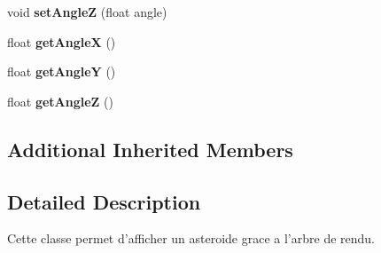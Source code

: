 \begin{DoxyCompactItemize}
\item 
\hypertarget{class_noeud_asteroide_a8674615a93c162a4fdc17768ab0aef0c}{void {\bfseries set\-Angle\-Z} (float angle)}\label{class_noeud_asteroide_a8674615a93c162a4fdc17768ab0aef0c}

\item 
\hypertarget{class_noeud_asteroide_a80b8db5ca5b9ae9ae14da2397aab19b5}{float {\bfseries get\-Angle\-X} ()}\label{class_noeud_asteroide_a80b8db5ca5b9ae9ae14da2397aab19b5}

\item 
\hypertarget{class_noeud_asteroide_a7b242e9e31832e72914cb31493521f3e}{float {\bfseries get\-Angle\-Y} ()}\label{class_noeud_asteroide_a7b242e9e31832e72914cb31493521f3e}

\item 
\hypertarget{class_noeud_asteroide_a8c5d24777b1f52bdc9a630250e46a3dc}{float {\bfseries get\-Angle\-Z} ()}\label{class_noeud_asteroide_a8c5d24777b1f52bdc9a630250e46a3dc}

\end{DoxyCompactItemize}
\subsection*{Additional Inherited Members}


\subsection{Detailed Description}
Cette classe permet d'afficher un asteroide grace a l'arbre de rendu. 

